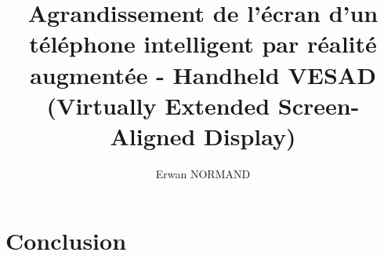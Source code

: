\documentclass[letterpaper, twoside, 12pt,%
 memoire, french, creativecommons, hyperref, withAlgo2e%
]{thETS}
\title{Agrandissement de l'écran d'un téléphone intelligent par réalité augmentée - Handheld VESAD (Virtually Extended Screen-Aligned Display)}
\author{Erwan NORMAND}
\begin{document}
\maketitle
\presentjury

\begin{avantpropos}
  
\end{avantpropos}

\begin{remerciements}
  
\end{remerciements}



\tableofcontents
\listoftables
\listoffigures

\begin{listofabbr}[3cm]
  
\end{listofabbr}

\cleardoublepage

\reversemarginpar
\setcounter{footnote}{0}

\begin{introduction}
  
\end{introduction}







\chapter*{Conclusion}
\label{ch:conclusion}


\appendix
\multiannexe




\newpage
\begin{spacing}{1}
  \nocite{*}
  
  
\end{spacing}
\end{document}
